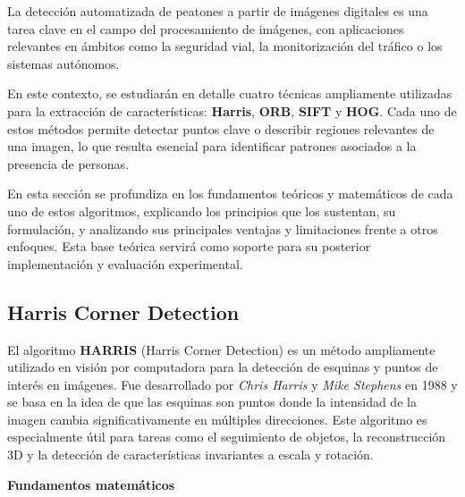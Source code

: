 \documentclass[a4paper]{article}
\begin{document}
 La detección automatizada de peatones a partir de imágenes digitales es una tarea clave en el campo del procesamiento de imágenes, con aplicaciones relevantes en ámbitos como la seguridad vial, la monitorización del tráfico o los sistemas autónomos. 
 
 \par\vspace{0.5cm}
 
 En este contexto, se estudiarán en detalle cuatro técnicas ampliamente utilizadas para la extracción de características: \textbf{Harris}, \textbf{ORB}, \textbf{SIFT} y \textbf{HOG}. Cada uno de estos métodos permite detectar puntos clave o describir regiones relevantes de una imagen, lo que resulta esencial para identificar patrones asociados a la presencia de personas.
 
 \par\vspace{0.5cm}
 
 En esta sección se profundiza en los fundamentos teóricos y matemáticos de cada uno de estos algoritmos, explicando los principios que los sustentan, su formulación, y analizando sus principales ventajas y limitaciones frente a otros enfoques. Esta base teórica servirá como soporte para su posterior implementación y evaluación experimental.
 

  \subsection{Harris Corner Detection}
  \par\vspace{0.5cm}

  El algoritmo \textbf{HARRIS} (Harris Corner Detection) es un método ampliamente utilizado en visión por computadora para la detección de esquinas y puntos de interés en imágenes. Fue desarrollado por \textit{Chris Harris} y \textit{Mike Stephens} en 1988 
  y se basa en la idea de que las esquinas son puntos donde la intensidad de la imagen cambia significativamente en múltiples direcciones. Este algoritmo es especialmente útil para tareas como el seguimiento de objetos, la reconstrucción 3D y la detección 
  de características invariantes a escala y rotación.

  \par\vspace{0.5cm}
  \textbf{Fundamentos matemáticos}
  \par\vspace{0.5cm}
  
\end{document}
